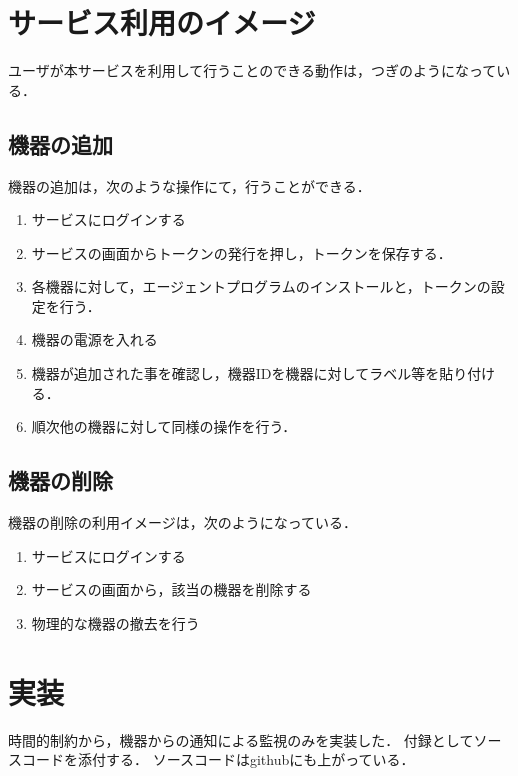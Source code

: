 \section{サービス利用のイメージ}
ユーザが本サービスを利用して行うことのできる動作は，つぎのようになっている．
\subsection{機器の追加}
機器の追加は，次のような操作にて，行うことができる．
\begin{enumerate}
\item サービスにログインする
\item サービスの画面からトークンの発行を押し，トークンを保存する．
\item 各機器に対して，エージェントプログラムのインストールと，トークンの設定を行う．
\item 機器の電源を入れる
\item 機器が追加された事を確認し，機器IDを機器に対してラベル等を貼り付ける．
\item 順次他の機器に対して同様の操作を行う．
\end{enumerate}

\subsection{機器の削除}
機器の削除の利用イメージは，次のようになっている．
\begin{enumerate}
\item サービスにログインする
\item サービスの画面から，該当の機器を削除する
\item 物理的な機器の撤去を行う
\end{enumerate}



\section{実装}
時間的制約から，機器からの通知による監視のみを実装した．
付録としてソースコードを添付する．
ソースコードはgithubにも上がっている．







